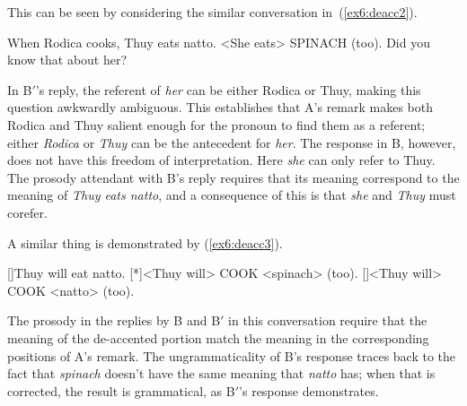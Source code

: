 This can be seen by considering the similar conversation in~(\ref{ex6:deacc2}).
\begin{exe}
	\raggedright
	\ex \label{ex6:deacc2}
	\begin{xlist}
		 When Rodica cooks, Thuy eats natto.
		 <She eats> SPINACH (too).
		 Did you know that about her?
	\end{xlist}
\end{exe}
In B$'$'s reply, the referent of \emph{her} can be either Rodica or Thuy, making this question awkwardly ambiguous. This establishes that A's remark makes both Rodica and Thuy salient enough for the pronoun to find them as a referent; either \emph{Rodica} or \emph{Thuy} can be the antecedent for \emph{her}. The response in B, however, does not have this freedom of interpretation. Here \emph{she} can only refer to Thuy. The prosody attendant with B's reply requires that its meaning correspond to the meaning of \emph{Thuy eats natto}, and a consequence of this is that \emph{she} and \emph{Thuy} must corefer.

A similar thing is demonstrated by (\ref{ex6:deacc3}).
\begin{exe}
	\raggedright
	\ex \label{ex6:deacc3}
	\begin{xlist}
		[]{Thuy will eat natto.}
		[*]{<Thuy will> COOK <spinach> (too).}
		[]{<Thuy will> COOK <natto> (too).}
	\end{xlist}
\end{exe}
The prosody in the replies by B and B$'$ in this conversation require that the meaning of the de-accented portion match the meaning in the corresponding positions of A's remark. The ungrammaticality of B's response traces back to the fact that \emph{spinach} doesn't have the same meaning that \emph{natto} has; when that is corrected, the result is grammatical, as B$'$'s response demonstrates.

